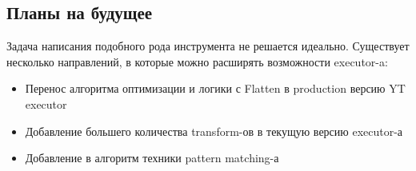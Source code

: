 \subsection{Планы на будущее}

Задача написания подобного рода инструмента не решается идеально. Существует несколько направлений, в которые можно расширять возможности executor-a:
\begin{itemize}
    \item Перенос алгоритма оптимизации и логики с Flatten в production версию YT executor
    \item Добавление большего количества transform-ов в текущую версию executor-а
    \item Добавление в алгоритм техники pattern matching-а
\end{itemize}
